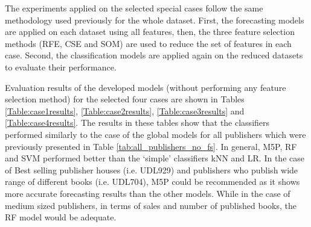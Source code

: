 \documentclass[a4paper,10pt,twocolumn,preprint,3p]{elsarticle}
\begin{document}
The experiments applied on the selected special cases follow the same methodology used previously for the whole dataset. First, the forecasting models are applied on each dataset using all features, then, the three feature selection methods (RFE, CSE and SOM) are used to reduce the set of features in each case. Second, the classification models are applied again on the reduced datasets to evaluate their performance.

Evaluation results of the developed models (without performing any feature selection method) for the selected four cases are shown in Tables \ref{Table:case1results}, \ref{Table:case2results}, \ref{Table:case3results} and \ref{Table:case4results}. The results in these tables show that the classifiers performed similarly to the case of the global models for all publishers which were previously presented in Table \ref{tab:all_publishers_no_fs}. In general, M5P, RF and SVM performed better than the `simple' classifiers kNN and LR. In the case of Best selling publisher houses (i.e. UDL929) and publishers who publish wide range of different books (i.e. UDL704), M5P could be recommended as it shows more accurate forecasting results than the other models. While in the case of medium sized publishers, in terms of sales and number of published books, the RF model would be adequate.


\begin{table*}
\caption{Predicting Total sales for publishing company-UDL929 (The best selling publishing company). Best values in bold. }
\centering{}%
\label{Table:case1results}
\end{table*}
\end{document}
